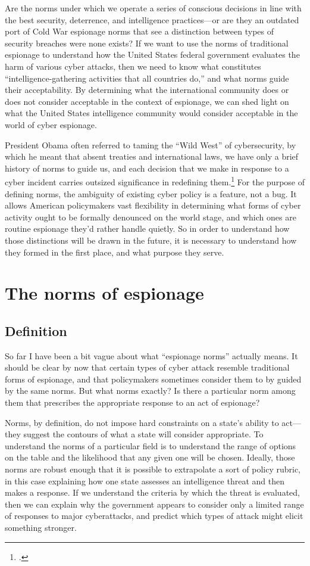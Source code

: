 \documentclass{memoir}
\begin{document}
\begin{refsegment}
Are the norms under which we operate a series of conscious decisions in line with the best security, deterrence, and intelligence practices---or are they an outdated port of Cold War espionage norms that see a distinction between types of security breaches were none exists? If we want to use the norms of traditional espionage to understand how the United States federal government evaluates the harm of various cyber attacks, then we need to know what constitutes ``intelligence-gathering activities that all countries do,'' and what norms guide their acceptability. By determining what the international community does or does not consider acceptable in the context of espionage, we can shed light on what the United States intelligence community would consider acceptable in the world of cyber espionage.

President Obama often referred to taming the ``Wild West'' of cybersecurity, by which he meant that absent treaties and international laws, we have only a brief history of norms to guide us, and each decision that we make in response to a cyber incident carries outsized significance in redefining them.\footcite{sanger_u.s._2016} For the purpose of defining norms, the ambiguity of existing cyber policy is a feature, not a bug. It allows American policymakers vast flexibility in determining what forms of cyber activity ought to be formally denounced on the world stage, and which ones are routine espionage they'd rather handle quietly. So in order to understand how those distinctions will be drawn in the future, it is necessary to understand how they formed in the first place, and what purpose they serve.

\section{The norms of espionage}
\subsection{Definition}
So far I have been a bit vague about what ``espionage norms'' actually means. It should be clear by now that certain types of cyber attack resemble traditional forms of espionage, and that policymakers sometimes consider them to by guided by the same norms. But what norms exactly? Is there a particular norm among them that prescribes the appropriate response to an act of espionage?

Norms, by definition, do not impose hard constraints on a state's ability to act---they suggest the contours of what a state will consider appropriate. To understand the norms of a particular field is to understand the range of options on the table and the likelihood that any given one will be chosen. Ideally, those norms are robust enough that it is possible to extrapolate a sort of policy rubric, in this case explaining how one state assesses an intelligence threat and then makes a response. If we understand the criteria by which the threat is evaluated, then we can explain why the government appears to consider only a limited range of responses to major cyberattacks, and predict which types of attack might elicit something stronger.


\end{refsegment}
\end{document}
